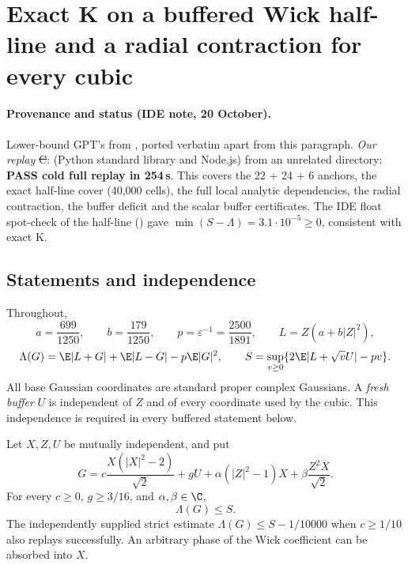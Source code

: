 \section{Exact K on a buffered Wick half-line and a radial contraction for every cubic}
\label{ch:exact-buffered-halfline}

\paragraph{Provenance and status (IDE note, 20 October).} Lower-bound GPT's  from
, ported verbatim apart from this paragraph. \emph{Our replay} \st{C}:  (Python standard library and
Node.js) from an unrelated directory: \textbf{PASS cold full replay in 254\,s}. This covers the 22 + 24 + 6 anchors, the exact half-line cover (40{,}000 cells), the full local analytic dependencies,
the radial contraction, the buffer deficit and the scalar buffer certificates. The IDE float spot-check of the half-line () gave
$\min(S-\Lambda)=3.1\cdot10^{-5}\ge0$, consistent with exact K.


\subsection{Statements and independence}
Throughout,
\[
 a=\frac{699}{1250},\qquad b=\frac{179}{1250},\qquad
 p=\varepsilon^{-1}=\frac{2500}{1891},\qquad
 L=Z(a+b|Z|^2),
\]
\[
 \Lambda(G)=\E|L+G|+\E|L-G|-p\E|G|^2,\qquad
 S=\sup_{v\ge0}\{2\E|L+\sqrt vU|-pv\}.
\]
All base Gaussian coordinates are standard proper complex Gaussians.
A \emph{fresh buffer} $U$ is independent of $Z$ and of every coordinate
used by the cubic. This independence is required in every buffered
statement below.

\begin{theorem}
\label{thm:exact-wick-halfline}
Let $X,Z,U$ be mutually independent, and put
\[
 G=c\frac{X(|X|^2-2)}{\sqrt2}+gU
      +\alpha(|Z|^2-1)X+\beta\frac{Z^2\overline X}{\sqrt2}.
\]
For every $c\ge0$, $g\ge3/16$, and $\alpha,\beta\in\C$,
\[
 \boxed{\Lambda(G)\le S.}
\]
The independently supplied strict estimate
$\Lambda(G)\le S-1/10000$ when $c\ge1/10$ also replays successfully.
An arbitrary phase of the Wick coefficient can be absorbed into $X$.
\end{theorem}

